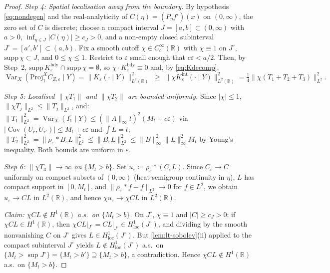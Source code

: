 \documentclass[11pt,reqno]{amsart}
\theoremstyle{plain}
\theoremstyle{definition}
\theoremstyle{remark}
\newcommand{\R}{\mathbb{R}}
\newcommand{\IBM}{Z}
\DeclareMathOperator{\Var}{Var}
\DeclareMathOperator{\Cov}{Cov}
\begin{document}
\begin{proof}
\emph{Step 4: Spatial localisation away from the boundary.}
By hypothesis \eqref{eq:nondegen} and the real-analyticity of
$C(\eta)=(P_\eta f')(x)$ on $(0,\infty)$, the zero set of $C$ is
discrete; choose a compact interval $J=[a,b]\subset(0,\infty)$ with
$a>0$, $\inf_{\eta\in J}|C(\eta)|\ge c_J>0$, and a non-empty closed
subinterval $J^{\circ}=[a',b']\subset(a,b)$. Fix a smooth cutoff
$\chi\in C_c^{\infty}(\R)$ with $\chi\equiv 1$ on $J^{\circ}$,
$\mathrm{supp}\,\chi\subset J$, and $0\le\chi\le 1$. Restrict to
$\varepsilon$ small enough that $c\varepsilon<a/2$. Then, by Step~2,
$\mathrm{supp}\,K_\varepsilon^{\mathrm{bdy}}\cap\mathrm{supp}\,\chi=\emptyset$,
so $\chi\cdot K_\varepsilon^{\mathrm{bdy}}\equiv 0$ and, by
\eqref{eq:Kdecomp},
\begin{equation}\label{eq:localised}
  \Var_X(\mathrm{Proj}_1^{X}C_{\IBM,\varepsilon}\mid Y)
  =\|K_\varepsilon(\cdot\mid Y)\|_{L^{2}(\R)}^{2}
  \;\ge\;\|\chi K_\varepsilon^{\mathrm{int}}(\cdot\mid Y)\|_{L^{2}(\R)}^{2}
  =\tfrac14\|\chi(T_1+T_2+T_3)\|_{L^{2}}^{2}.
\end{equation}

\emph{Step 5: Localised $\|\chi T_1\|$ and $\|\chi T_2\|$ are bounded
uniformly.}
Since $|\chi|\le 1$, $\|\chi T_j\|_{L^{2}}\le\|T_j\|_{L^{2}}$, and:
$\|T_1\|_{L^{2}}^{2}=\Var_X(I_1^\varepsilon\mid Y)
\le(\|A\|_\infty t)^{2}(M_t+c\varepsilon)$ via
$|\Cov(U_r,U_{r'})|\le M_t+c\varepsilon$ and
$\int L=t$; $\|T_2\|_{L^{2}}^{2}=\|\rho_\varepsilon*B_\varepsilon L\|_{L^{2}}^{2}
\le\|B_\varepsilon L\|_{L^{2}}^{2}\le\|B\|_\infty^{2}\|L\|_\infty^{2}M_t$
by Young's inequality. Both bounds are uniform in $\varepsilon$.

\emph{Step 6: $\|\chi T_3\|\to\infty$ on $\{M_t>b\}$.}
Set $u_\varepsilon\coloneqq\rho_\varepsilon*(C_\varepsilon L)$. Since
$C_\varepsilon\to C$ uniformly on compact subsets of $(0,\infty)$
(heat-semigroup continuity in $\eta$), $L$ has compact support in
$[0,M_t]$, and $\|\rho_\varepsilon*f-f\|_{L^{2}}\to 0$ for
$f\in L^{2}$, we obtain $u_\varepsilon\to CL$ in $L^{2}(\R)$, and
hence $\chi u_\varepsilon\to\chi CL$ in $L^{2}(\R)$.

\emph{Claim: $\chi CL\notin H^{1}(\R)$ a.s.\ on $\{M_t>b\}$.}
On $J^{\circ}$, $\chi\equiv 1$ and $|C|\ge c_J>0$; if
$\chi CL\in H^{1}(\R)$, then $\chi CL|_{J^{\circ}}=CL|_{J^{\circ}}
\in H^{1}_{\mathrm{loc}}(J^{\circ})$, and dividing by the smooth
nonvanishing $C$ on $J^{\circ}$ gives $L\in H^{1}_{\mathrm{loc}}(J^{\circ})$.
But \cref{lem:lt-sobolev}(ii) applied to the compact subinterval
$J^{\circ}$ yields $L\notin H^{1}_{\mathrm{loc}}(J^{\circ})$ a.s.\ on
$\{M_t>\sup J^{\circ}\}=\{M_t>b'\}\supseteq\{M_t>b\}$, a
contradiction. Hence $\chi CL\notin H^{1}(\R)$ a.s.\ on $\{M_t>b\}$.


\end{proof}
\end{document}
